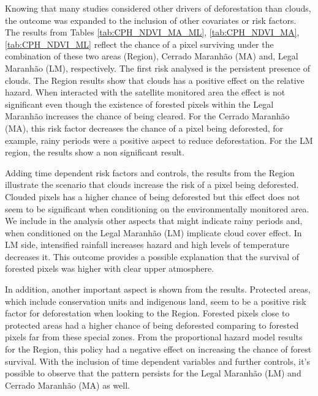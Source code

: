 Knowing that many studies considered other drivers of deforestation than clouds, the outcome was expanded to the inclusion of other covariates or risk factors. 
The results from Tables \ref{tab:CPH_NDVI_MA_ML}, \ref{tab:CPH_NDVI_MA}, \ref{tab:CPH_NDVI_ML}  reflect the chance of a pixel surviving under the combination of these two areas (Region), Cerrado Maranhão (MA) and, Legal Maranhão (LM), respectively. The first risk analysed is the persistent presence of clouds. The Region results show that clouds has a positive effect on the relative hazard. When interacted with the satellite monitored area the effect is not significant even though the existence of forested pixels within the Legal Maranhão increases the chance of being cleared. For the Cerrado Maranhão (MA), this risk factor decreases the chance of a pixel being deforested, for example, rainy periods were a positive aspect to reduce deforestation. For the LM region, the results show a non significant result. 

Adding time dependent risk factors and controls, the results from the Region illustrate the scenario that clouds increase the risk of a pixel being deforested. Clouded pixels has a higher chance of being deforested but this effect does not seem to be significant when conditioning on the environmentally monitored area. We include in the analysis other aspects that might indicate rainy periods and, when conditioned on the Legal Maranhão (LM) implicate cloud cover effect. In LM side, intensified rainfall increases hazard and high levels of temperature decreases it. This outcome provides a possible explanation that the survival of forested pixels was higher with clear upper atmosphere.

In addition, another important aspect is shown from the results. Protected areas, which include conservation units and indigenous land, seem to be a positive risk factor for deforestation when looking to the Region. Forested pixels close to protected areas had a higher chance of being deforested comparing to forested pixels far from these special zones. From the proportional hazard model results for the Region, this policy had a negative effect on increasing the chance of forest survival. With the inclusion of time dependent variables and further controls, it's possible to observe that the pattern persists for the Legal Maranhão (LM) and Cerrado Maranhão (MA) as well. 

